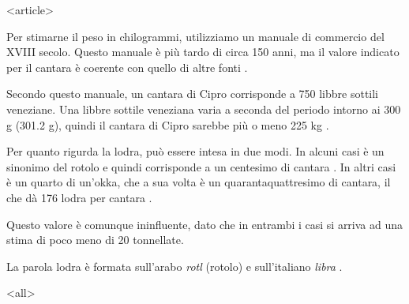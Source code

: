 
\mode
<article>

Per  stimarne  il  peso  in  chilogrammi, utilizziamo  un  manuale  di
commercio del  XVIII secolo. Questo manuale  è più tardo  di circa 150
anni, ma  il valore indicato per  il cantara è coerente  con quello di
altre fonti \cite[p. 40]{triulzi1766}.

Secondo questo manuale,  un cantara di Cipro corrisponde  a 750 libbre
sottili veneziane.   Una libbre sottile veneziana varia  a seconda del
periodo intorno ai 300 g (301.2 g), quindi il cantara di Cipro sarebbe
più o meno 225 kg \cite{websizes}.

Per quanto rigurda la lodra, può  essere intesa in due modi. In alcuni
casi è un  sinonimo del rotolo e quindi corrisponde  a un centesimo di
cantara \cite{websizes}. In  altri casi è un quarto  di un'okka, che a
sua volta è un quarantaquattresimo di cantara, il che dà 176 lodra per
cantara \cite[voce {\it lodra}]{okyanus}.

Questo valore è  comunque ininfluente, dato che in  entrambi i casi si
arriva ad una stima di poco meno di 20 tonnellate.

La  parola   lodra  è  formata   sull'arabo  {\it  rotl}   (rotolo)  e
sull'italiano {\it libra} \cite[voce {\it lodra}]{okyanus}.

\mode
<all>



